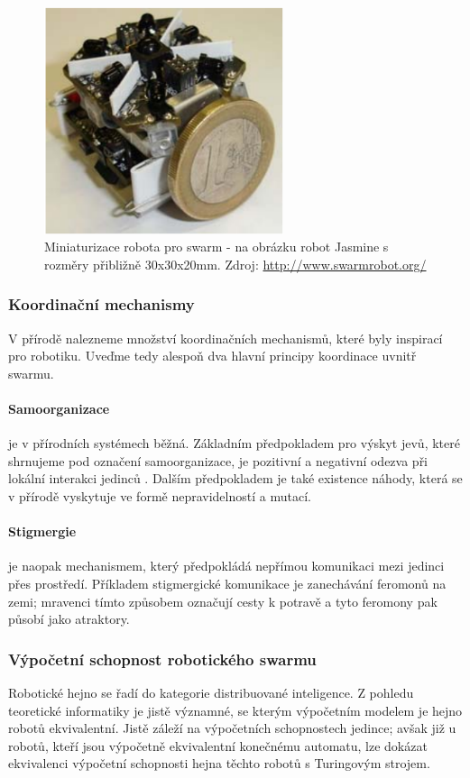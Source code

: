 \documentclass[a4paper,12pt]{article}
\begin{document}
\begin{figure}[here]
  \centering
  \includegraphics[width=7cm]{./img/jasmine.png}
  \caption{Miniaturizace robota pro swarm - na obrázku robot Jasmine s rozměry přibližně
    30x30x20mm. Zdroj: \url{http://www.swarmrobot.org/}}
  \label{fig:jasmine}
\end{figure}


\subsubsection{Koordinační mechanismy}
V přírodě nalezneme množství koordinačních mechanismů, které byly inspirací pro robotiku.
Uveďme tedy alespoň dva hlavní principy koordinace uvnitř swarmu.
\paragraph{Samoorganizace} {je v přírodních systémech běžná. Základním předpokladem pro
    výskyt jevů, které shrnujeme pod označení samoorganizace, je pozitivní a negativní
    odezva při lokální interakci jedinců \cite{Bonabeau99}. Dalším předpokladem je také
    existence náhody, která se v přírodě vyskytuje ve formě nepravidelností a mutací.}
\paragraph{Stigmergie} {je naopak mechanismem, který předpokládá nepřímou komunikaci
    mezi jedinci přes prostředí. Příkladem stigmergické komunikace je zanechávání feromonů
    na zemi; mravenci tímto způsobem označují cesty k potravě a tyto feromony pak působí
    jako atraktory.}

\subsubsection{Výpočetní schopnost robotického swarmu}
Robotické hejno se řadí do kategorie distribuované inteligence. Z pohledu teoretické
informatiky je jistě významné, se kterým výpočetním modelem je hejno robotů ekvivalentní.
Jistě záleží na výpočetních schopnostech jedince; avšak již u robotů, kteří jsou výpočetně
ekvivalentní konečnému automatu, lze dokázat ekvivalenci výpočetní schopnosti hejna těchto
robotů s Turingovým strojem.
\end{document}
